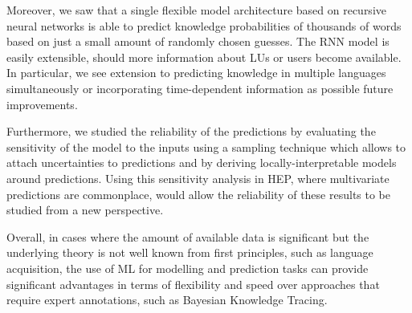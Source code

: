 Moreover, we saw that a single flexible model architecture based on recursive neural networks is able to predict knowledge probabilities of thousands of words based on just a small amount of randomly chosen guesses. The RNN model is easily extensible, should more information about LUs or users become available. In particular, we see extension to predicting knowledge in multiple languages simultaneously or incorporating time-dependent information as possible future improvements.

Furthermore, we studied the reliability of the predictions by evaluating the sensitivity of the model to the inputs using a sampling technique which allows to attach uncertainties to predictions and by deriving locally-interpretable models around predictions. Using this sensitivity analysis in HEP, where multivariate predictions are commonplace, would allow the reliability of these results to be studied from a new perspective.

Overall, in cases where the amount of available data is significant but the underlying theory is not well known from first principles, such as language acquisition, the use of ML for modelling and prediction tasks can provide significant advantages in terms of flexibility and speed over approaches that require expert annotations, such as Bayesian Knowledge Tracing.